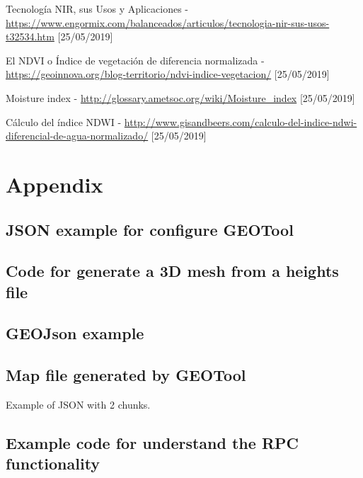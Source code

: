 \documentclass[10pt,a4paper,twocolumn,twoside]{article}
\begin{document}
\begin{thebibliography}{11}
Tecnología NIR, sus Usos y Aplicaciones - \url{https://www.engormix.com/balanceados/articulos/tecnologia-nir-sus-usos-t32534.htm} [25/05/2019]

El NDVI o Índice de vegetación de diferencia normalizada - \url{https://geoinnova.org/blog-territorio/ndvi-indice-vegetacion/} [25/05/2019]

Moisture index - \url{http://glossary.ametsoc.org/wiki/Moisture_index} [25/05/2019]

Cálculo del índice NDWI - \url{http://www.gisandbeers.com/calculo-del-indice-ndwi-diferencial-de-agua-normalizado/} [25/05/2019]

\end{thebibliography}

\newpage
\appendix
\section*{Appendix}

\setcounter{section}{1}

\subsection{JSON example for configure GEOTool}
\label{appendix:geotoolconfig}


\subsection{Code for generate a 3D mesh from a heights file}
\label{appendix:generateobj}


\subsection{GEOJson example}
\label{appendix:geojson}


\subsection{Map file generated by GEOTool}
\label{appendix:mapjson}

Example of JSON with 2 chunks.


\subsection{Example code for understand the RPC functionality}
\label{appendix:extendrpc}
\end{document}

